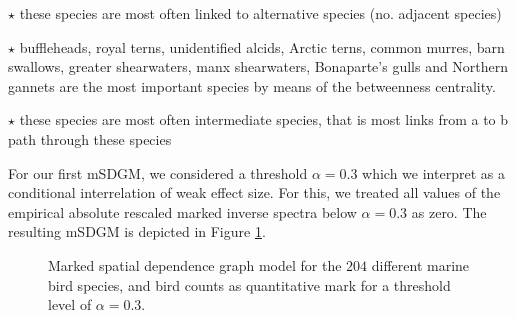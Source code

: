 \documentclass{statsoc}
\begin{document}
$\star$ these species are most often linked to alternative species (no. adjacent species)


$\star$ buffleheads, royal terns, unidentified alcids, Arctic terns, common murres, barn swallows, greater shearwaters, manx shearwaters, Bonaparte's gulls and Northern gannets are the most important species by means of the betweenness centrality.


$\star$ these species are most often intermediate species, that is most links from a to b path through these species

For our first mSDGM, we considered a threshold $\alpha=0.3$ which we interpret as a conditional interrelation of weak effect size. For this, we treated all values of the empirical absolute rescaled marked inverse spectra below $\alpha=0.3$ as zero. The resulting mSDGM  is depicted in Figure \ref{fig:g30}.


\begin{figure}
\centering
{}
      \caption{\label{fig:g30} Marked spatial dependence graph model for the $204$ different marine bird species, and bird counts as quantitative mark for a threshold level of $\alpha=0.3$.}
\end{figure} 
\end{document}
